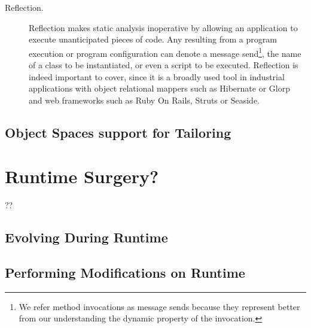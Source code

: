 \begin{description}

\item[Reflection.] Reflection makes static analysis inoperative by allowing an application to execute unanticipated pieces of code. 
Any  resulting from a program execution or program configuration can denote a message send\footnote{We refer method invocations as message sends because they represent better from our understanding the dynamic property of the invocation.}, the name of a class to be instantiated, or even a script to be executed. Reflection is indeed important to cover, since it is a broadly used tool in industrial applications with object relational mappers such as Hibernate or Glorp and web frameworks such as Ruby On Rails, Struts or Seaside.

\end{description}


\subsection{Object Spaces support for Tailoring}


\section{Runtime Surgery?}

??

\subsection{Evolving During Runtime}

\subsection{Performing Modifications on Runtime}

